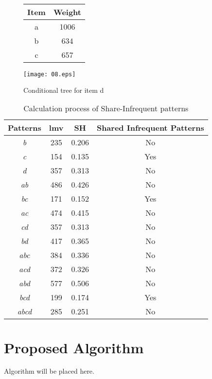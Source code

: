 \begin{figure}[ht]

{\centering
\begin{minipage}{.4\textwidth}
  \centering
  
	\begin{center}
	\begin{tabular}{ |c|c| } 
	\hline
	Item & Weight \\
	\hline
	a & 1006\\
	b & 634\\
	c & 657\\
	\hline
	\end{tabular}
\end{center}  
\end{minipage}
\hfill
\begin{minipage}{0.60\textwidth}
  \centering
  \texttt{[image: 08.eps]}
\end{minipage}
}
\caption{Conditional tree for item d}
\label{fig:insert10}
\end{figure} 



\begin{table}
\begin{center}
\begin{tabular}{ |c|c|c|c| } 
\hline
Patterns & lmv & SH & Shared Infrequent Patterns \\
\hline
{\it b} & 235 & 0.206 & No\\
{\it c} & 154 & 0.135 & Yes\\
{\it d} & 357 & 0.313 & No\\
{\it ab} & 486 & 0.426 & No\\
{\it bc} & 171 & 0.152 & Yes\\
{\it ac} & 474 & 0.415 & No\\
{\it cd} & 357 & 0.313 & No\\
{\it bd} & 417 & 0.365 & No\\
{\it abc} & 384 & 0.336 & No\\
{\it acd} & 372 & 0.326 & No\\
{\it abd} & 577 & 0.506 & No\\
{\it bcd} & 199 & 0.174 & Yes\\
{\it abcd} & 285 & 0.251 & No\\


\hline
\end{tabular}
\caption{Calculation process of Share-Infrequent patterns}
\label{tab:Table2}
\end{center}
\end{table}

\clearpage
\section{Proposed Algorithm}
Algorithm will be placed here.

%
%
%
%
%

